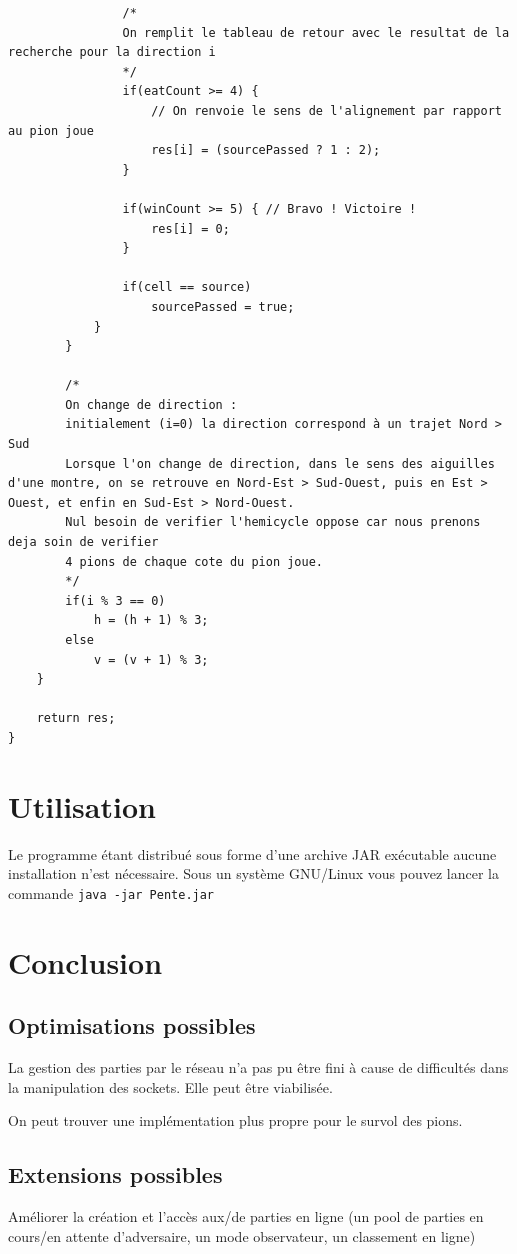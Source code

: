 \documentclass[12pt]{article}
\begin{document}
\begin{lstlisting}
				/*
				On remplit le tableau de retour avec le resultat de la recherche pour la direction i
				*/
				if(eatCount >= 4) {
					// On renvoie le sens de l'alignement par rapport au pion joue
					res[i] = (sourcePassed ? 1 : 2);
				}

				if(winCount >= 5) {	// Bravo ! Victoire !
					res[i] = 0;
				}

				if(cell == source)
					sourcePassed = true;
			}
		}

		/*
		On change de direction :
		initialement (i=0) la direction correspond à un trajet Nord > Sud
		Lorsque l'on change de direction, dans le sens des aiguilles d'une montre, on se retrouve en Nord-Est > Sud-Ouest, puis en Est > Ouest, et enfin en Sud-Est > Nord-Ouest.
		Nul besoin de verifier l'hemicycle oppose car nous prenons deja soin de verifier
		4 pions de chaque cote du pion joue.
		*/
		if(i % 3 == 0)
			h = (h + 1) % 3;
		else
			v = (v + 1) % 3;
	}

	return res;
}
	\end{lstlisting}

\section{Utilisation}
Le programme étant distribué sous forme d'une archive JAR exécutable aucune installation n'est nécessaire. Sous un système GNU/Linux vous pouvez lancer la commande
\texttt{java -jar Pente.jar}

\section{Conclusion}
	\subsection{Optimisations possibles}
	La gestion des parties par le réseau n'a pas pu être fini à cause de difficultés dans la manipulation des sockets. Elle peut être viabilisée.

	On peut trouver une implémentation plus propre pour le survol des pions.

	\subsection{Extensions possibles}
	Améliorer la création et l'accès aux/de parties en ligne (un pool de parties en cours/en attente d'adversaire, un mode observateur, un classement en ligne)

\newpage


\end{document}
